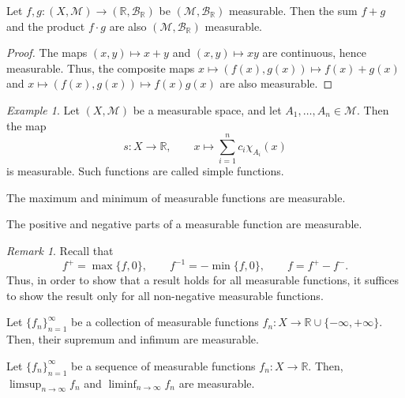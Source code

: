 \documentclass[11pt]{article}
\newcommand{\R}{\mathbb{R}}
\newcommand{\M}{\mathcal{M}}
\theoremstyle{definition}
\theoremstyle{remark}
\newtheorem*{remark}{Remark}
\newtheorem*{example}{Example}
\numberwithin{equation}{section}
\begin{document}
    \begin{corollary}
        Let $f, g\colon (X, \M) \to (\R, \mathcal{B}_\R)$ be $(\M, \mathcal{B}_\R)$
        measurable. Then the sum $f + g$ and the product $f\cdot g$ are also $(\M,
        \mathcal{B}_\R)$ measurable.
    \end{corollary}
    \begin{proof}
        The maps $(x, y) \mapsto x + y$ and $(x, y) \mapsto xy$ are continuous, hence
        measurable. Thus, the composite maps $x \mapsto (f(x), g(x)) \mapsto f(x) +
        g(x)$ and $x \mapsto (f(x), g(x)) \mapsto f(x)g(x)$ are also measurable.
    \end{proof}

    \begin{example}
        Let $(X, \M)$ be a measurable space, and let $A_1, \dots, A_n \in \M$. Then
        the map \[
            s\colon X \to \R, \qquad x \mapsto \sum_{i = 1}^n c_i \chi_{A_i}(x)
        \] is measurable. Such functions are called simple functions.
    \end{example}

    \begin{lemma}
        The maximum and minimum of measurable functions are measurable.
    \end{lemma}
    \begin{corollary}
        The positive and negative parts of a measurable function are measurable.
        \begin{remark}
            Recall that \[
                f^+ = \max\{f, 0\}, \qquad f^{-1} = -\min\{f, 0\}, \qquad f = f^+ -
                f^-.
            \] Thus, in order to show that a result holds for all measurable
            functions, it suffices to show the result only for all non-negative
            measurable functions.
        \end{remark}
    \end{corollary}


    \begin{theorem}
        Let $\{f_n\}_{n = 1}^\infty$ be a collection of measurable functions
        $f_n\colon X \to \R \cup \{-\infty, +\infty\}$. Then, their supremum and
        infimum are measurable.
    \end{theorem}

    \begin{theorem}
        Let $\{f_n\}_{n = 1}^\infty$ be a sequence of measurable functions $f_n\colon
        X \to \R$. Then, $\limsup_{n \to \infty} f_n$ and $\liminf_{n \to \infty}
        f_n$ are measurable.
    \end{theorem}
\end{document}
